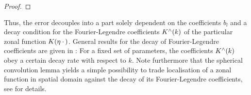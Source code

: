 \documentclass[11pt,a4paper,twoside,bibtotoc]{scrartcl}
\theoremstyle{plain}
\theoremstyle{definition}
\theoremstyle{remark}
\newcommand{\fun}[2]{\ensuremath{#1{\hspace{-0.4ex}}\left(#2\right)}}
\newcommand{\dx}{\text{\rm{d}}}
\numberwithin{equation}{section}
\numberwithin{table}{section}
\numberwithin{figure}{section}
\begin{document}
\begin{proof}
\end{proof}

Thus, the error decouples into a part solely dependent on the coefficients
$b_l$ and a decay condition for the Fourier-Legendre coefficients 
$\fun{K^{\wedge}}{k}$ of the
particular zonal function $\fun{K}{\mathbf{\eta} \: \cdot \,}$.
General results for the decay of Fourier-Legendre coefficients are given in
\cite{Sc97,bahu01,CaFi}: For a fixed set of parameters, the coefficients
$\fun{K^{\wedge}}{k}$ obey a certain decay rate with respect to $k$.
Note furthermore that the spherical convolution lemma \cite[pp. 63]{frgesc} yields a simple
possibility to trade localisation of a zonal function in spatial domain
against the decay of its Fourier-Legendre coefficients, see \cite{Sc97} for
details.
\end{document}
